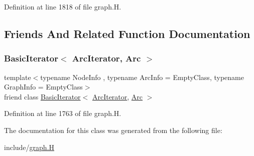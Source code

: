 Definition at line 1818 of file graph.\+H.



\subsection{Friends And Related Function Documentation}
\mbox{\label{class_designar_1_1_digraph_1_1_arc_iterator_a530ad7c7218fa9b74a5cce004d0e3a1c}} 
\subsubsection{\texorpdfstring{Basic\+Iterator$<$ Arc\+Iterator, Arc $>$}{BasicIterator< ArcIterator, Arc >}}
{\footnotesize\ttfamily template$<$typename Node\+Info , typename Arc\+Info  = Empty\+Class, typename Graph\+Info  = Empty\+Class$>$ \\
friend class \hyperlink{class_designar_1_1_basic_iterator}{Basic\+Iterator}$<$ \hyperlink{class_designar_1_1_digraph_1_1_arc_iterator}{Arc\+Iterator}, \hyperlink{class_designar_1_1_digraph_a0ceb278671f2a535c00fddccdeafd69f}{Arc} $>$\hspace{0.3cm}{\ttfamily [friend]}}



Definition at line 1763 of file graph.\+H.



The documentation for this class was generated from the following file\+:\begin{DoxyCompactItemize}
\item 
include/\hyperlink{graph_8_h}{graph.\+H}\end{DoxyCompactItemize}
